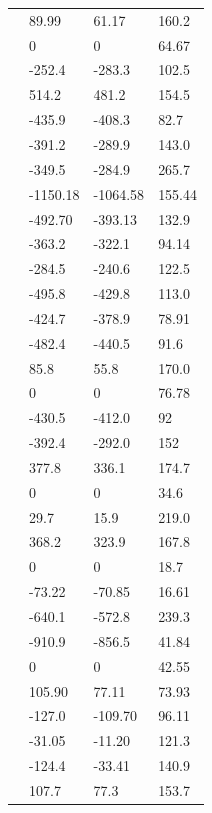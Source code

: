 \begin{supertabular}{llll}
     & 89.99 & 61.17 & 160.2 \\
     & 0 & 0 & 64.67 \\
     & -252.4 & -283.3 & 102.5 \\
     & 514.2 & 481.2 & 154.5 \\
     & -435.9 & -408.3 & 82.7 \\
     & -391.2 & -289.9 & 143.0 \\
     & -349.5 & -284.9 & 265.7 \\
     & -1150.18 & -1064.58 & 155.44 \\
     & -492.70 & -393.13 & 132.9 \\
     & -363.2 & -322.1 & 94.14 \\
     & -284.5 & -240.6 & 122.5 \\
     & -495.8 & -429.8 & 113.0 \\
     & -424.7 & -378.9 & 78.91 \\
     & -482.4 & -440.5 & 91.6 \\
     & 85.8 & 55.8 & 170.0 \\
     & 0 & 0 & 76.78 \\
     & -430.5 & -412.0 & 92 \\
     & -392.4 & -292.0 & 152 \\
     & 377.8 & 336.1 & 174.7 \\
     & 0 & 0 & 34.6 \\
     & 29.7 & 15.9 & 219.0 \\
     & 368.2 & 323.9 & 167.8 \\
     & 0 & 0 & 18.7 \\
     & -73.22 & -70.85 & 16.61 \\
     & -640.1 & -572.8 & 239.3 \\
     & -910.9 & -856.5 & 41.84 \\
     & 0 & 0 & 42.55 \\
     & 105.90 & 77.11 & 73.93 \\
     & -127.0 & -109.70 & 96.11 \\
     & -31.05 & -11.20 & 121.3 \\
     & -124.4 & -33.41 & 140.9 \\
     & 107.7 & 77.3 & 153.7 \\

\end{supertabular}
